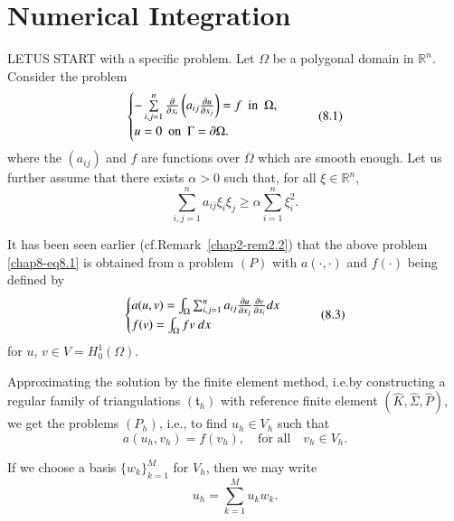 
\chapter{Numerical Integration}\label{chap8}

LET\pageoriginale US START with a specific problem. Let $\Omega$ be a
polygonal domain in $\mathbb{R}^{n}$. Consider the problem
\begin{equation*}
\begin{cases}
-\sum\limits^{n}_{i,j=1}\frac{\partial}{\partial x_{i}}\left(a_{ij}\frac{\partial u}{\partial
  x_{j}}\right)=f\text{~ in~ }\Omega,\\
u=0\text{~ on~ }\Gamma=\partial \Omega.
\end{cases}\tag{8.1}\label{chap8-eq8.1}
\end{equation*}
where the $(a_{ij})$ and $f$ are functions over $\overline{\Omega}$
which are smooth enough. Let us further assume that there exists
$\alpha>0$ such that, for all $\xi\in \mathbb{R}^{n}$,
\begin{equation*}
\sum^{n}_{i,j=1}a_{ij}\xi_{i}\xi_{j}\geq
\alpha\sum^{n}_{i=1}\xi^{2}_{i}.\tag{8.2}\label{chap8-eq8.2} 
\end{equation*}

It has been seen earlier (cf.\@ Remark~\ref{chap2-rem2.2}) that the
above problem \eqref{chap8-eq8.1} is obtained from a problem $(P)$
with $a(\cdot,\cdot)$ and $f(\cdot)$ being defined by
\begin{equation*}
\begin{cases}
a(u,v)=\int_{\Omega}\sum^{n}_{i,j=1}a_{ij}\frac{\partial u}{\partial
  x_{j}}\frac{\partial v}{\partial x_{i}}dx\\
f(v)=\int_{\Omega}fv\ dx
\end{cases}\tag{8.3}\label{chap8-eq8.3}
\end{equation*}
for $u$, $v\in V=H^{1}_{0}(\Omega)$.

Approximating the solution by the finite element method, i.e.\@ by
constructing a regular family of triangulations $(\mathfrak{t}_{h})$
with reference finite element $(\hat{K},\hat{\Sigma},\hat{P})$, we get
the problems $(P_{h})$, i.e., to find $u_{h}\in V_{h}$ such that 
\begin{equation*}
a(u_{h},v_{h})=f(v_{h}),\quad\text{for all}\quad v_{h}\in
V_{h}.\tag{8.4}\label{chap8-eq8.4} 
\end{equation*}

If we choose a basis $\{w_{k}\}^{M}_{k=1}$ for $V_{h}$, then we may
write
\begin{equation*}
u_{h}=\sum^{M}_{k=1}u_{k}w_{k}.\tag{8.5}\label{chap8-eq8.5}
\end{equation*}


